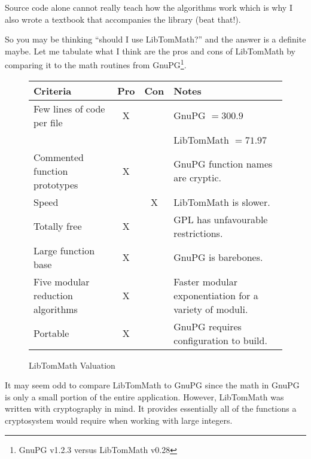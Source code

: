 \documentclass[synpaper]{book}
\begin{document}
Source code alone cannot really teach how the algorithms work which is why I also wrote a textbook
that accompanies the library (beat that!).

So you may be thinking ``should I use LibTomMath?'' and the answer is a definite maybe.  Let me
tabulate what I think are the pros and cons of LibTomMath by comparing it to the math routines from
GnuPG\footnote{GnuPG v1.2.3 versus LibTomMath v0.28}.

\newpage\begin{figure}[h]
  \begin{small}
    \begin{center}
      \begin{tabular}{|p{4.5cm}|c|c|p{4.5cm}|}
        \hline \textbf{Criteria}                 & \textbf{Pro} & \textbf{Con} & \textbf{Notes}
        \\
        \hline Few lines of code per file        & X            &              & GnuPG $ = 300.9$
        \\
                                                 &              &              & LibTomMath	$ =
          71.97$\hfill
        \\
        \hline Commented function prototypes     & X            &              & GnuPG function
        names are cryptic.
        \\
        \hline Speed                             &              & X            & LibTomMath is
        slower.
        \\
        \hline Totally free                      & X            &              & GPL has
        unfavourable restrictions.
        \\
        \hline Large function base               & X            &              & GnuPG is
        barebones.
        \\
        \hline Five modular reduction algorithms & X            &              & Faster modular
        exponentiation for a variety of
        moduli.
        \\
        \hline Portable                          & X            &              & GnuPG requires
        configuration to build.
        \\
        \hline
      \end{tabular}
    \end{center}
  \end{small}
  \caption{LibTomMath Valuation}
\end{figure}

It may seem odd to compare LibTomMath to GnuPG since the math in GnuPG is only a small portion of
the entire application. However, LibTomMath was written with cryptography in mind.  It provides
essentially all of the functions a cryptosystem would require when working with large integers.
\end{document}
